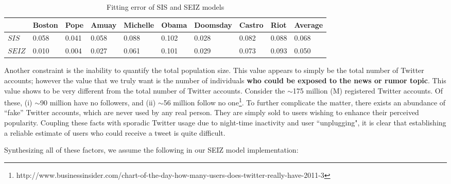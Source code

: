 \begin{table}[t]
\tiny
\caption{Fitting error of SIS and SEIZ models}
\vspace{0.5em}
\centering
\begin{tabular}{| p{0.8cm}| p{1.2cm}| p{1cm} | p{1cm}| p{1.2cm} | p{1.3cm} | p{1.5cm} | p{1.2cm} | p{1.2cm}| p{1.3cm}| }
\hline
&\textbf{Boston}& \textbf{Pope} & \textbf{Amuay} & \textbf{Michelle} & \textbf{Obama} &\textbf{Doomsday} &\textbf{Castro}& \textbf{Riot}& \textbf{Average}   \\ [1ex]
\hline
\textbf{$SIS$} & 0.058 &0.041 & 0.058 & 0.088 & 0.102 & 0.028 & 0.082 & 0.088 & 0.068\\[1ex]
\hline
\textbf{$SEIZ$} & 0.010 & 0.004 &0.027 & 0.061 &0.101 & 0.029 & 0.073 & 0.093 & 0.050 \\[1ex]
\hline
\end{tabular}
\label{table:error} %
\end{table}


Another constraint is the inability to quantify the total population size. This value appears to simply be the total number of Twitter accounts; however the value that we truly want is the number of individuals {\bf who could be exposed to the news or rumor topic}. This value shows to be very different from the total number of Twitter accounts. Consider the $\sim$175 million (M) registered Twitter accounts. Of these, (i) $\sim$90 million have no followers, and (ii) $\sim$56 million follow no one\footnote{http://www.businessinsider.com/chart-of-the-day-how-many-users-does-twitter-really-have-2011-3}. To further complicate the matter, there exists an abundance of
``fake'' Twitter accounts, which are never used by any real person. They are simply sold to users wishing to enhance their perceived popularity. Coupling these facts with sporadic Twitter usage due to night-time inactivity and user ``unplugging", it is clear that establishing a reliable estimate of users who could receive a tweet is quite difficult.

Synthesizing all of these factors, we assume the following in our SEIZ model implementation:

